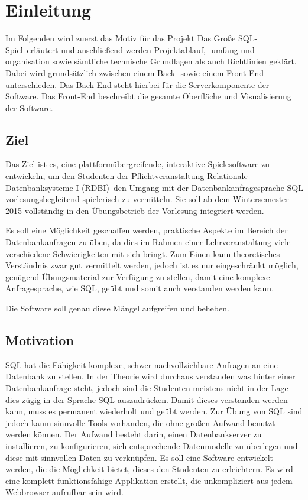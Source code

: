 
\chapter{Einleitung}

Im Folgenden wird zuerst das Motiv f\"ur das Projekt \glqq Das Gro\ss{}e SQL-Spiel\grqq~erl\"autert und anschlie{\ss}end werden Projektablauf, -umfang und -organisation sowie s\"amtliche technische Grundlagen als auch Richtlinien gekl\"art. Dabei wird grunds\"atzlich zwischen einem Back- sowie einem Front-End unterschieden. Das Back-End steht hierbei f\"ur die Serverkomponente der Software. Das Front-End beschreibt die gesamte Oberfl\"ache und Visualisierung der Software.


\section{Ziel}

Das Ziel ist es, eine plattform\"ubergreifende, interaktive Spielesoftware zu entwickeln, um den Studenten der Pflichtveranstaltung \glqq Relationale Datenbanksysteme I (RDBI)\grqq~den Umgang mit der Datenbankanfragesprache SQL vorlesungsbegleitend spielerisch zu vermitteln. Sie soll ab dem Wintersemester 2015 vollst\"andig in den \"Ubungsbetrieb der Vorlesung integriert werden. 

Es soll eine M\"oglichkeit geschaffen werden, praktische Aspekte im Bereich der Datenbankanfragen zu \"uben, da dies im Rahmen einer Lehrveranstaltung viele verschiedene Schwierigkeiten mit sich bringt. Zum Einen kann theoretisches Verst\"andnis zwar gut vermittelt werden, jedoch ist es nur eingeschr\"ankt m\"oglich, gen\"ugend \"Ubungsmaterial zur Verf\"ugung zu stellen, damit eine komplexe Anfragesprache, wie SQL, ge\"ubt und somit auch verstanden werden kann.

Die Software soll genau diese M\"angel aufgreifen und beheben.


\section{Motivation} 

SQL hat die F\"ahigkeit komplexe, schwer nachvollziehbare Anfragen an eine Datenbank zu stellen. In der Theorie wird durchaus verstanden was hinter einer Datenbankanfrage steht, jedoch sind die Studenten meistens nicht in der Lage dies z\"ugig in der Sprache SQL auszudr\"ucken. Damit dieses verstanden werden kann, muss es permanent wiederholt und ge\"ubt werden. 
Zur \"Ubung von SQL sind jedoch kaum sinnvolle Tools vorhanden, die ohne gro{\ss}en Aufwand benutzt werden k\"onnen. 
Der Aufwand besteht darin, einen Datenbankserver zu installieren, zu konfigurieren, sich entsprechende Datenmodelle zu \"uberlegen und diese mit sinnvollen Daten zu verkn\"upfen.   
Es soll eine Software entwickelt werden, die die M\"oglichkeit bietet, dieses den Studenten zu erleichtern. Es wird eine komplett funktionsf\"ahige Applikation erstellt, die unkompliziert aus jedem Webbrowser aufrufbar sein wird.

